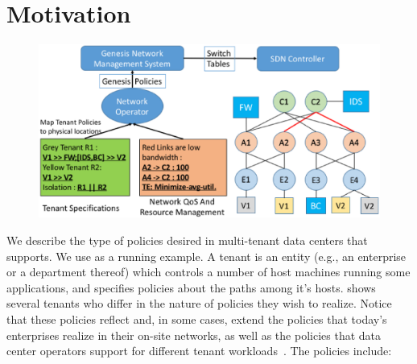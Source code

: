 \section{Motivation}
\begin{figure}
	\includegraphics[width=\columnwidth,center]{figures/architecture.eps}
	\label{fig:architecture}
\end{figure}



We describe the type of policies desired in multi-tenant data centers
that \Name supports.
We use  as a running example. A tenant is an
entity (e.g., an enterprise or a department thereof) which controls a
number of host machines running some applications, and specifies
policies about the paths among it's hosts.  shows several tenants
who differ in the nature of policies they wish to realize.  Notice
that these policies reflect and, in some cases, extend the policies
that today's enterprises realize in their on-site networks, as well as
the policies that data center operators support for different
tenant workloads~\cite{mpa-imc15}.  The policies include:





